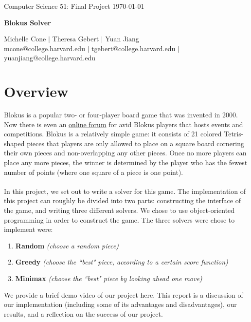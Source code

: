 \documentclass[11pt]{article}
\begin{document}
\doublespacing

\noindent Computer Science 51: Final Project \hfill \today\\
\noindent\makebox[\linewidth]{\rule{6.5in}{2.0pt}}

\begin{center}

\smallskip
{{\LARGE \bf Blokus Solver}}
\smallskip

\noindent\makebox[\linewidth]{\rule{6.5in}{2.0pt}}

\bigskip

{\large Michelle Cone $|$ Theresa Gebert $|$ Yuan Jiang \\
\normalsize mcone@college.harvard.edu $|$ tgebert@college.harvard.edu $|$ yuanjiang@college.harvard.edu} \\

\end{center}


\bigskip


\section{Overview}

Blokus is a popular two- or four-player board game that was invented in 2000. Now there is even an \href{http://forum.blokus.refreshed.be/}{online forum} for avid Blokus players that hosts events and competitions. Blokus is a relatively simple game: it consists of 21 colored Tetris-shaped pieces that players are only allowed to place on a square board cornering their own pieces and non-overlapping any other pieces. Once no more players can place any more pieces, the winner is determined by the player who has the fewest number of points (where one square of a piece is one point).
\\\\
In this project, we set out to write a solver for this game. The implementation of this project can roughly be divided into two parts: constructing the interface of the game, and writing three different solvers. We chose to use object-oriented programming in order to construct the game. The three solvers were chose to implement were:
\begin{enumerate}
	\item {\bf Random} {\it (choose a random piece)}
	\item {\bf Greedy} {\it (choose the ``best" piece, according to a certain score function)}
	\item {\bf Minimax} {\it (choose the ``best" piece by looking ahead one move)}
\end{enumerate}
We provide a brief demo video of our project here. %
This report is a discussion of our implementation (including some of its advantages and disadvantages), our results, and a reflection on the success of our project.
\end{document}
